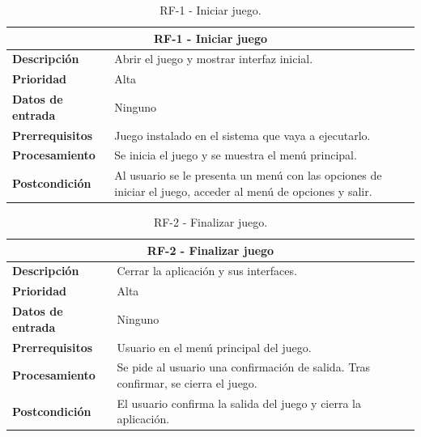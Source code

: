 \begin{table}[H]
	\centering
	\caption{RF-1 - Iniciar juego.}
	\label{table:RF1}
	\begin{tabular}{|l|p{10cm}|}
		\hline
		\multicolumn{2}{|c|}{\textbf{RF-1 - Iniciar juego}} \\
		\hline
		\textbf{Descripción} & Abrir el juego y mostrar interfaz inicial. \\
		\hline
		\textbf{Prioridad} & Alta \\
		\hline
		\textbf{Datos de entrada} & Ninguno \\
		\hline
		\textbf{Prerrequisitos} & Juego instalado en el sistema que vaya a ejecutarlo. \\
		\hline
		\textbf{Procesamiento} & Se inicia el juego y se muestra el menú principal. \\
		\hline
		\textbf{Postcondición} & Al usuario se le presenta un menú con las opciones de iniciar el juego, acceder al menú de opciones y salir. \\
		\hline
	\end{tabular}
	
\end{table}
\begin{table}[H]
	\centering
	\caption{RF-2 - Finalizar juego.}
	\label{table:RF2}
	\begin{tabular}{|l|p{10cm}|}
		\hline
		\multicolumn{2}{|c|}{\textbf{RF-2 - Finalizar juego}} \\
		\hline
		\textbf{Descripción} & Cerrar la aplicación y sus interfaces. \\
		\hline
		\textbf{Prioridad} & Alta \\
		\hline
		\textbf{Datos de entrada} & Ninguno \\
		\hline
		\textbf{Prerrequisitos} & Usuario en el menú principal del juego. \\
		\hline
		\textbf{Procesamiento} & Se pide al usuario una confirmación de salida. Tras confirmar, se cierra el juego. \\
		\hline
		\textbf{Postcondición} & El usuario confirma la salida del juego y cierra la aplicación. \\
		\hline
	\end{tabular}
	
\end{table}
